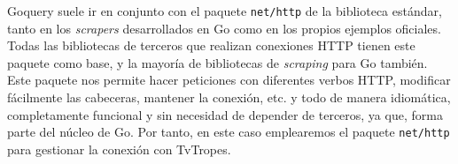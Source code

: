 Goquery suele ir en conjunto con el paquete \texttt{net/http} de la biblioteca
estándar, tanto en los \textit{scrapers} desarrollados en Go como en los propios
ejemplos oficiales. Todas las bibliotecas de terceros que realizan conexiones
HTTP tienen este paquete como base, y la mayoría de bibliotecas de
\textit{scraping} para Go también. Este paquete nos permite hacer peticiones con
diferentes verbos HTTP, modificar fácilmente las cabeceras, mantener la
conexión, etc. y todo de manera idiomática, completamente funcional y sin
necesidad de depender de terceros, ya que, forma parte del núcleo de Go. Por
tanto, en este caso emplearemos el paquete \texttt{net/http} para gestionar la
conexión con TvTropes. 
